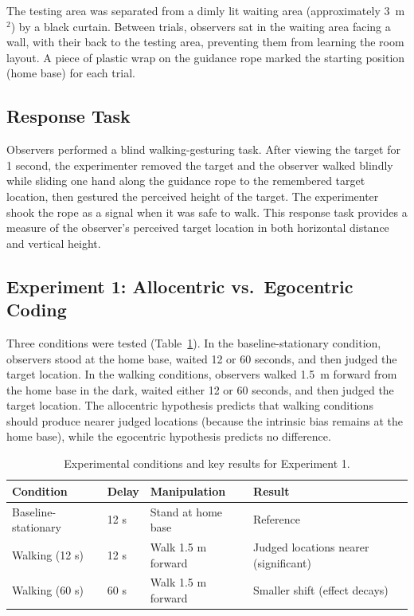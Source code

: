 \documentclass[12pt]{article}
\begin{document}
The testing area was separated from a dimly lit waiting area (approximately 3~m$^2$) by a black curtain. Between trials, observers sat in the waiting area facing a wall, with their back to the testing area, preventing them from learning the room layout. A piece of plastic wrap on the guidance rope marked the starting position (home base) for each trial.

\subsection{Response Task}

Observers performed a blind walking-gesturing task. After viewing the target for 1 second, the experimenter removed the target and the observer walked blindly while sliding one hand along the guidance rope to the remembered target location, then gestured the perceived height of the target. The experimenter shook the rope as a signal when it was safe to walk. This response task provides a measure of the observer's perceived target location in both horizontal distance and vertical height.

\subsection{Experiment 1: Allocentric vs.\ Egocentric Coding}

Three conditions were tested (Table~\ref{tab:exp1conditions}). In the baseline-stationary condition, observers stood at the home base, waited 12 or 60 seconds, and then judged the target location. In the walking conditions, observers walked 1.5~m forward from the home base in the dark, waited either 12 or 60 seconds, and then judged the target location. The allocentric hypothesis predicts that walking conditions should produce nearer judged locations (because the intrinsic bias remains at the home base), while the egocentric hypothesis predicts no difference.

\begin{table}[ht]
\centering
\caption{Experimental conditions and key results for Experiment 1.}
\label{tab:exp1conditions}
\begin{tabular}{llll}
\toprule
\textbf{Condition} & \textbf{Delay} & \textbf{Manipulation} & \textbf{Result} \\
\midrule
Baseline-stationary & 12 s & Stand at home base & Reference \\
Walking (12 s) & 12 s & Walk 1.5 m forward & Judged locations nearer (significant) \\
Walking (60 s) & 60 s & Walk 1.5 m forward & Smaller shift (effect decays) \\
\bottomrule
\end{tabular}
\end{table}
\end{document}
